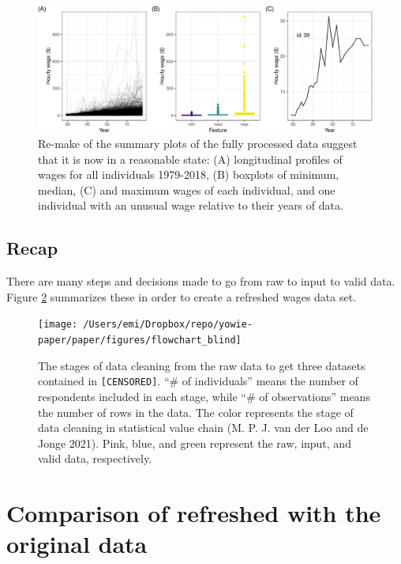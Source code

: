 \documentclass{article}
\begin{document}
\begin{figure}

{\centering \includegraphics[width=1\linewidth]{figures/fixed-feature-plot-1} 

}

\caption{Re-make of the summary plots of the fully processed data suggest that it is now in a reasonable state: (A) longitudinal profiles of wages for all individuals 1979-2018, (B) boxplots of minimum, median, (C) and maximum wages of each individual, and one individual with an unusual wage relative to their years of data. }\label{fig:fixed-feature-plot}
\end{figure}

\hypertarget{recap}{%
\subsection{Recap}\label{recap}}

There are many steps and decisions made to go from raw to input to valid data. Figure \ref{fig:flow-chart-blind} summarizes these in order to create a refreshed wages data set.



\begin{figure}

{\centering \texttt{[image: /Users/emi/Dropbox/repo/yowie-paper/paper/figures/flowchart\_blind]} 

}

\caption{The stages of data cleaning from the raw data to get three datasets contained in \texttt{[CENSORED]}. ``\# of individuals'' means the number of respondents included in each stage, while ``\# of observations'' means the number of rows in the data. The color represents the stage of data cleaning in statistical value chain (M. P. J. van der Loo and de Jonge 2021). Pink, blue, and green represent the raw, input, and valid data, respectively.}\label{fig:flow-chart-blind}
\end{figure}

\hypertarget{compare}{%
\section{Comparison of refreshed with the original data}\label{compare}}
\end{document}

